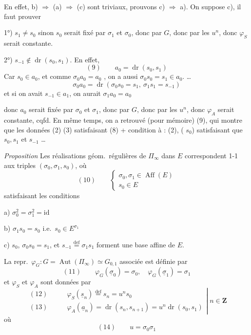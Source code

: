 \documentclass[11pt,a4paper]{article}
\begin{document}
En effet, b) $\Rightarrow$ (a) $\Rightarrow$ (c) sont triviaux, prouvons c) $\Rightarrow$ a). On suppose c), il faut prouver

1°) $s_1 \neq s_0$ sinon $s_0$ serait fixé par $\sigma_1$ et $\sigma_0$, donc par $G$, donc par les $u^{n}$, donc $\varphi_S$ serait constante.

2°) $s_{-1} \notin \operatorname{dr}(s_0, s_1)$. En effet, \struck{\ill{}}
\[
(9) \qquad a_0 = \operatorname{dr}(s_0, s_1)
\]
Car $s_0 \in a_0$, et comme $\sigma_0 a_0 = a_0$ , on a aussi $\sigma_0 s_0 = s_1 \in a_0$.   \ldots
\[
\sigma_0 a_0 = \operatorname{dr}(\sigma_0 s_0 = s_1,\ \sigma_1 s_1 = s_{-1})
\]
et si on avait $s_{-1} \in a_1$, on aurait $\sigma_1 a_0 = a_0$

donc $a_0$ serait fixée par $\sigma_0$ et $\sigma_1$, donc par $G$, donc par les $u^{n}$, donc $\varphi_A$ serait constante, cqfd.
En même temps, on a retrouvé (pour mémoire) (9), qui montre que les données (2) (3) satisfaisant (8) + condition   à : (2), \struck{\ill{}}  ( $s_0$) satisfaisant que $s_0, s_1$ et $s_{-1}$ \ldots{}

\emph{Proposition} Les réalisations géom.\ régulières de $\Pi_\infty$ dans $E$ correspondent 1-1 aux triples $(\sigma_0, \sigma_1, s_0)$, où
\[
(10) \qquad
\begin{cases}
\sigma_0, \sigma_1 \in \operatorname{Aff}(E) \\
s_0 \in E
\end{cases}
\]
satisfaisant les conditions

a) $\sigma_0^{2} = \sigma_1^{2} = \mathrm{id}$

b) $\sigma_1 s_0 = s_0$ i.e.\ $s_0 \in E^{\sigma_1}$

c) $s_0$, $\sigma_0 s_0 = s_1$, et $s_{-1} \overset{\mathrm{def}}{=} \sigma_1 s_1$ forment une base affine de $E$.

La repr.\ $\varphi_G : G = \operatorname{Aut}(\Pi_\infty) \simeq G_{0,1}$ associée est définie par
\[
(11) \qquad \varphi_G(\underline{\sigma}_0) = \sigma_0, \quad \varphi_G(\underline{\sigma}_1) = \sigma_1
\]
et $\varphi_S$ et $\varphi_A$ sont données par
\[
\left.
\begin{aligned}
(12) \qquad & \varphi_S(\underline{s}_n) \overset{\mathrm{def}}{=} s_n = u^{n} s_0 \\
(13) \qquad & \varphi_A(\underline{a}_n) = \operatorname{dr}(s_n, s_{n+1}) = u^{n} \operatorname{dr}(s_0, s_1)
\end{aligned}
\right| \; n \in \mathbf{Z}
\]
où
\[
(14) \qquad u = \sigma_0 \sigma_1
\]
\end{document}

